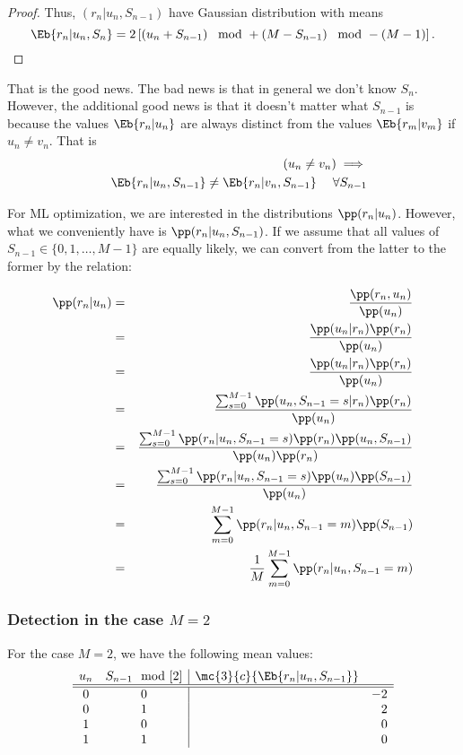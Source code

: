\begin{proof}
Thus, $(r_n|u_n,S_{n-1})$ have Gaussian distribution with means
\[ \Eb{r_n|u_n,S_n} =  2\left[
           \left( u_n + S_{n-1} \right)\mod + \left( M   - S_{n-1}\right)\mod
           - (M - 1) \right]. \]
\end{proof}

That is the good news.
The bad news is that in general we don't know $S_n$.
However, the additional good news is that it doesn't matter what
$S_{n-1}$ is because the values $\Eb{r_n|u_n}$ are
always distinct from the values $\Eb{r_m|v_m}$
if $u_n\ne v_n$.
That is
\begin{eqnarray*}
   && (u_n\ne v_n)\implies
 \\&&
   \Eb{r_n|u_n,S_{n-1}} \ne \Eb{r_n|v_n,S_{n-1}}
   \hspace{3ex}\forall S_{n-1}
\end{eqnarray*}

For ML optimization, we are interested in the distributions
$\pp(r_n|u_n)$.
However, what we conveniently have is $\pp(r_n|u_n,S_{n-1})$.
If we assume that all values of $S_{n-1}\in\{0,1,\ldots,M-1\}$
are equally likely, we can convert from the latter to the
former by the relation:

\begin{eqnarray*}
   \pp(r_n|u_n)
      &=& \frac{\pp(r_n,u_n)}{\pp(u_n)}
    \\&=& \frac{\pp(u_n|r_n)\pp(r_n)}
               {\pp(u_n)}
    \\&=& \frac{\pp(u_n|r_n)\pp(r_n)}
               {\pp(u_n)}
    \\&=& \frac{\sum_{s=0}^{M-1}\pp(u_n,S_{n-1}=s|r_n)\pp(r_n)}
               {\pp(u_n)}
    \\&=& \frac{\sum_{s=0}^{M-1}\pp(r_n|u_n,S_{n-1}=s)\pp(r_n)\pp(u_n,S_{n-1})}
               {\pp(u_n)\pp(r_n)}
    \\&=& \frac{\sum_{s=0}^{M-1}\pp(r_n|u_n,S_{n-1}=s)\pp(u_n)\pp(S_{n-1})}
               {\pp(u_n)}
    \\&=& \sum_{m=0}^{M-1}\pp(r_n|u_n,S_{n-1}=m)\pp(S_{n-1})
    \\&=& \frac{1}{M}\sum_{m=0}^{M-1}\pp(r_n|u_n,S_{n-1}=m)
\end{eqnarray*}


\subsubsection{Detection in the case $M=2$}
For the case $M=2$, we have the following mean values:
\[
\begin{array}{cc|rrr}
   u_n & S_{n-1}\mod[2] & \mc{3}{c}{\Eb{r_n|u_n,S_{n-1}}} \\
   \hline
   \hline
   0 & 0 && -2 \\
   0 & 1 &&  2 \\
   1 & 0 &&  0 \\
   1 & 1 &&  0
\end{array}
\]

